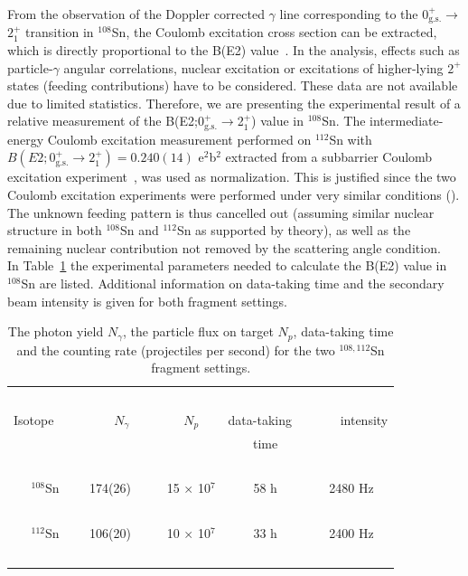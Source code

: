 \documentclass[prc,twocolumn,amssymb,amsmath,showpacs,superscriptaddress]{revtex4}
\begin{document}
From the observation of the Doppler corrected $\gamma$ line
corresponding to the $0^{+}_{\text{g.s.}}$$\to$$2^{+}_{1}$
transition in $^{108}$Sn, the Coulomb excitation cross section can
be extracted, which is directly proportional to the B(E2)
value~\cite{win79}. In the analysis, effects such as
particle-$\gamma$ angular correlations, nuclear excitation or
excitations of higher-lying $2^{+}$ states (feeding contributions)
have to be considered. These data are not available due to limited
statistics. Therefore, we are presenting the experimental result
of a relative measurement of the
B(E2;0$^+_{\text{g.s.}}$$\to$2$^+_1$) value in $^{108}$Sn. The
intermediate-energy Coulomb excitation measurement performed on
$^{112}$Sn with $B(E2;0^{+}_{\text{g.s.}}\to 2^{+}_{1}) =
0.240(14)$ e$^{2}$b$^{2}$ extracted from a subbarrier Coulomb
excitation experiment~\cite{ram01}, was used as normalization.
This is justified since the two Coulomb excitation experiments
were performed under very similar conditions (\cite{ban05}). The
unknown feeding pattern is thus cancelled out (assuming similar
nuclear structure in both $^{108}$Sn and $^{112}$Sn as supported
by theory), as well as the remaining nuclear
contribution not removed by the scattering angle condition.\\
In Table~\ref{tab-1} the experimental parameters needed to
calculate the B(E2) value in $^{108}$Sn are listed. Additional
information on data-taking time and the secondary beam intensity
is given for both fragment settings.
\begin{table}[htb]
\caption{The photon yield $N_{\gamma}$, the particle flux on
target $N_{p}$, data-taking time and the counting rate
(projectiles per second) for the two $^{108,112}$Sn fragment
settings.} \label{tab-1}
\begin{tabular}[t]{ccccc}
\hline \hline
           &               &              &               &  ~~~ \\
Isotope ~~~& $N_{\gamma}$\footnotemark[1] & $N_{p}$\footnotemark[2] &  data-taking ~& ~~~~intensity\\
           &               &              &       time        &  ~~~ \\
\hline \hline
           &               &              &               &  ~~~ \\
$^{108}$Sn & 174(26) ~~~  & 15 $\times$ 10$^{7}$&  58 h   & 2480 Hz\\
           &               &              &               &  ~~~ \\
$^{112}$Sn & 106(20) ~~~  & 10 $\times$ 10$^{7}$&  33 h   & 2400 Hz\\
           &               &              &               &  ~~~ \\
\hline \hline
\end{tabular}
 
\end{table}
\end{document}
